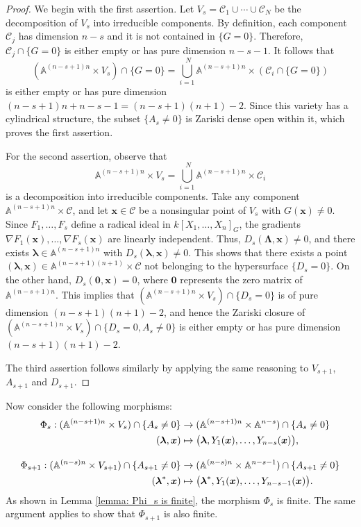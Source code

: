 \documentclass[pdflatex,sn-basic]{sn-jnl}%
\theoremstyle{thmstyleone}%
\theoremstyle{thmstyletwo}%
\theoremstyle{thmstylethree}%
\theoremstyle{definition}
\numberwithin{equation}{section}
\newcommand{\bfs}{\boldsymbol}
\newcommand{\A}{\mathbb A}
\def\ifm#1#2{\relax \ifmmode#1\else#2\fi}
\newcommand{\klk}    {\ifm {,\ldots,} {$,\ldots,$}}
\begin{document}
\begin{proof}
We begin with the first assertion. Let
$V_s=\mathcal{C}_1\cup\cdots\cup\mathcal{C}_N$ be the decomposition
of $V_s$ into irreducible components. By definition, each component
$\mathcal{C}_j$ has dimension $n-s$ and it is not contained in
$\{G=0\}$. Therefore, $\mathcal{C}_j\cap\{G=0\}$ is either empty or has pure
dimension $n-s-1$. It follows that
%
$$(\A^{(n-s+1)n} \times V_s)\cap\{G=0\}=
\bigcup\limits_{i=1}^{\,\,N}
\A^{(n-s+1)n}\times(\mathcal{C}_i\cap\{G=0\})$$
%
is either empty or has pure dimension $(n-s+1)n+n-s-1=(n-s+1)(n+1)-2$.
Since this variety has a cylindrical structure, the subset $\{A_s\not=0\}$
is Zariski dense open within it, which proves the first assertion.

For the second assertion, observe that
%
$$\A^{(n-s+1)n}\times V_s=\bigcup\limits_{i=1}^{\,\,N}
\A^{(n-s+1)n}\times\mathcal{C}_i$$
%
is a decomposition into irreducible components. Take any component
$\A^{(n-s+1)n}\times\mathcal{C}$, and let
$\bfs x\in\mathcal{C}$ be a nonsingular point of $V_s$ with $G(\bfs x)\not=0$.
Since $F_1,\ldots,F_s$ define a radical ideal in $k[X_1,\ldots,X_n]_G$,
the gradients $\nabla F_1(\bfs x),\ldots,\nabla F_s(\bfs x)$ are
linearly independent. Thus,
$D_s(\bfs\Lambda,\bfs x)\not=0$, and there exists
$\bfs\lambda\in\A^{(n-s+1)n}$ with $D_s(\bfs\lambda,\bfs x)\not=0$.
This shows that there exists a point $(\bfs\lambda,\bfs
x)\in\A^{(n-s+1)(n+1)}\times \mathcal{C}$ not belonging to the
hypersurface $\{D_s=0\}$. On the other hand, $D_s(\bfs 0,\bfs x)=0$,
where $\bfs 0$ represents the zero matrix of $\A^{(n-s+1)n}$. This
implies that $(\A^{(n-s+1)n}\times V_s)\cap\{D_s=0\}$ is of pure
dimension $(n-s+1)(n+1)-2$, and hence the Zariski closure of
$(\A^{(n-s+1)n}\times V_s) \cap\{D_s=0,A_s\not=0\}$ is either empty
or has pure dimension $(n-s+1)(n+1)-2$.

The third assertion follows similarly by applying the same
reasoning to $V_{s+1}$, $A_{s+1}$ and $D_{s+1}$.
\end{proof}

Now consider the following morphisms:
%
\begin{align*}
\Phi_s: (\A^{(n-s+1)n}\times V_s)\cap\{A_s\not=0\} &\to
(\A^{(n-s+1)n}\times\A^{n-s})\cap\{A_s\not=0\}
\\(\bfs\lambda,\bfs x)&\mapsto\big(\bfs\lambda,
Y_1(\bfs x)\klk Y_{n-s}(\bfs x)\big),\\[2ex]
\Phi_{s+1}:(\A^{(n-s)n} \times V_{s+1})\cap\{A_{s+1}\not=0\}&\to
(\A^{(n-s)n}\times\A^{n-s-1})\cap\{A_{s+1}\not=0\}\\
(\bfs\lambda^*,\bfs x)&\mapsto\big(\bfs\lambda^*, Y_1(\bfs
x),\dots,Y_{n-s-1}(\bfs x)\big).
\end{align*}
%
As shown in Lemma \ref{lemma: Phi_s is finite}, the morphism $\Phi_s$
is finite. The same argument applies to show that
$\Phi_{s+1}$ is also finite.
\end{document}
